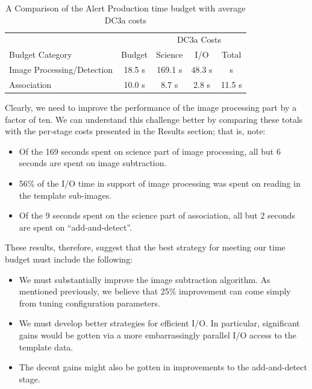 \begin{table}[htbp]
\centering
\caption{A Comparison of the Alert Production time budget with average
  DC3a costs 
\label{tbl:budget}}
\vspace{\baselineskip}
\begin{tabular}{lc|ccc}
\hline\hline
                           &        & \multicolumn{3}{c}{DC3a Costs}   \\
Budget Category            & Budget & Science    & I/O       & Total   \\
\hline
Image Processing/Detection & 18.5 s & 169.1 s    & 48.3 s    &  s \\
Association                & 10.0 s &   8.7 s    &  2.8 s    &  11.5 s \\
\hline
\end{tabular}
\end{table}

Clearly, we need to improve the performance of the image processing
part by a factor of ten.  We can understand this challenge better by
comparing these totals with the per-stage costs presented in the
Results section; that is, note:

\begin{itemize}
\item Of the 169 seconds spent on science part of image processing, all
  but 6 seconds are spent on image subtraction.
\item 56\% of the I/O time in support of image processing was spent on
  reading in the template sub-images. 
\item Of the 9 seconds spent on the science part of association, all
  but 2 seconds are spent on ``add-and-detect''.  
\end{itemize}

These results, therefore, suggest that the best strategy for meeting
our time budget must include the following:

\begin{itemize}
\item We must substantially improve the image subtraction algorithm.
  As mentioned previously, we believe that 25\% improvement can come
  simply from tuning configuration parameters.  
\item We must develop better strategies for efficient I/O.  In
  particular, significant gains would be gotten via a more
  embarrassingly parallel I/O access to the template data.
\item The decent gains might also be gotten in improvements to the
  add-and-detect stage.  
\end{itemize}



